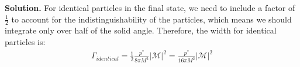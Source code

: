 \documentclass[11pt,a4paper]{article}
\newenvironment{solution}{\vspace{1cm} \par\textbf{Solution.} \vspace{1cm}}{\newpage}
\begin{document}
\begin{solution}
For identical particles in the final state, we need to include a factor of $\frac{1}{2}$ 
to account for the indistinguishability of the particles, which means we should integrate only 
over half of the solid angle. Therefore, the width for identical particles is:
\begin{align*}
  \Gamma_{identical} = \frac{1}{2} \frac{p^{*}}{8\pi M^2} |\mathcal{M}|^2 = \frac{p^{*}}{16\pi M^2} |\mathcal{M}|^2
\end{align*}

\end{solution}
\end{document}
